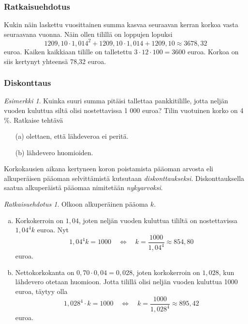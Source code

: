 \documentclass{article}\usepackage[]{graphicx}\usepackage[]{color}
\theoremstyle{remark}
\newtheorem{esim}{Esimerkki}
\newtheorem{ratkaisu}{Ratkaisuehdotus}
\begin{document}
\begin{frame}
  \frametitle{Ratkaisuehdotus}
        Kukin näin laskettu vuosittainen summa kasvaa seuraavan kerran korkoa vasta seuraavana vuonna.
        \pause
        Näin ollen tilillä on loppujen lopuksi
        \pause
        \[
            1209,10\cdot 1,014^2+1209,10\cdot1,014+1209,10\approx 3678,32
        \]
        euroa.
        \pause
        Kaiken kaikkiaan tilille on talletettu \(3\cdot12\cdot100 = 3600\) euroa.
        \pause
        Korkoa on siis kertynyt yhteensä 78,32 euroa.
\end{frame}

\begin{frame}
    \frametitle{Diskonttaus}
    \pause
    \begin{esim}
        Kuinka suuri summa pitäisi tallettaa pankkitilille, jotta neljän vuoden kuluttua siltä olisi nostettavissa 1 000 euroa? 
        Tilin vuotuinen korko on 4 \%. Ratkaise tehtävä
        \begin{enumerate}
            \item[(a)] olettaen, että lähdeveroa ei peritä.
            \item[(b)] lähdevero huomioiden.
        \end{enumerate}
    \end{esim}
    \pause
    Korkokausien aikana kertyneen koron poistamista pääoman arvosta eli alkuperäisen pääoman selvittämistä kutsutaan 
    \emph{diskonttaukseksi}.
    \pause
    Diskonttauksella saatua alkuperäistä pääomaa nimitetään \emph{nykyarvoksi}.
\end{frame}

\begin{frame}
    \begin{ratkaisu}
        Olkoon alkuperäinen pääoma \(k\).
        \begin{enumerate}[(a)]
            \item Korkokerroin on \(1,04\), joten neljän vuoden kuluttua tililtä on nostettavissa \(1,04^4k\) euroa. 
            \pause
                Nyt
                \[
                    1,04^4k = 1000\quad\Leftrightarrow\quad k = \frac{1000}{1,04^4}\approx 854,80
                \]
                euroa.
            \pause
            \item Nettokorkokanta on \(0,70\cdot0,04=0,028\), joten korkokerroin on \(1,028\), kun lähdevero otetaan huomioon. \pause
                Jotta tilillä olisi neljän vuoden kuluttua 1000 euroa, täytyy olla
                \[
                    1,028^4\cdot k = 1000\quad\Leftrightarrow\quad k = \frac{1000}{1,028^4}\approx 895,42
                \]
                euroa.
        \end{enumerate}
    \end{ratkaisu}
\end{frame}
\end{document}
